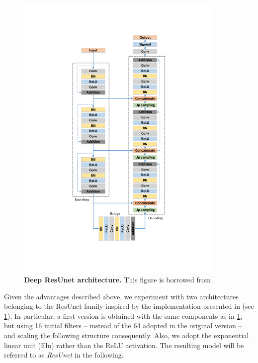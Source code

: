 \begin{figure}
\centerline{
\includegraphics[width=0.9\textwidth]{figures/130_methods/resunet.pdf}
}
\caption{\textbf{Deep ResUnet architecture.}
This figure is borrowed from \protect \cite{deep_resunet}.
} \label{fig:resunet_architecture}
\end{figure}
Given the advantages described above, we experiment with two architectures belonging to the ResUnet family inspired by the implementation presented in  (see \cref{fig:resunet_architecture}).
In particular, a first version is obtained with the same components as in \cref{fig:resunet_architecture}, but using 16 initial filters -- instead of the 64 adopted in the original version \cite{deep_resunet} -- and scaling the following structure consequently.
Also, we adopt the exponential linear unit (Elu) \cite{clevert2015elu} rather than the ReLU activation.
The resulting model will be referred to as \textit{ResUnet} in the following.

